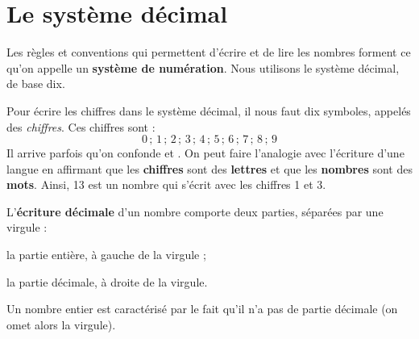 \section{Le système décimal}


Les règles et conventions qui permettent d'écrire et de lire les nombres forment ce qu'on appelle un \textbf{système de numération}. Nous utilisons le système décimal, de base dix.

\begin{aconnaitre}
Pour écrire les chiffres dans le système décimal, il nous faut dix symboles, appelés des \emph{chiffres}. Ces chiffres sont :
\[ 0\,;\,1\,;\,2\,;\,3\,;\,4\,;\,5\,;\,6\,;\,7\,;\,8\,;\,9  \]
Il arrive parfois qu'on confonde \textbf{} et \textbf{}. On peut faire l'analogie avec l'écriture d'une langue en affirmant que les \textbf{\textcolor{H1}{chiffres}} sont des \textbf{\textcolor{H1}{lettres}} et que les \textbf{\textcolor{H1}{nombres}} sont des \textbf{\textcolor{H1}{mots}}. Ainsi, 13 est un nombre qui s'écrit avec les chiffres 1 et 3.
\end{aconnaitre}


L'\textbf{\textcolor{C2}{écriture décimale}} d'un nombre comporte deux parties, séparées par une virgule :

\hspace{2em}\textbullet\hspace{.25em} la partie entière, à gauche de la virgule ;

\hspace{2em}\textbullet\hspace{.25em} la partie décimale, à droite de la virgule.

Un nombre entier est caractérisé par le fait qu'il n'a pas de partie décimale (on omet alors la virgule).




